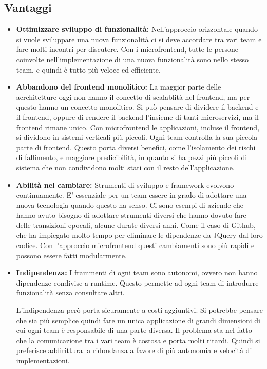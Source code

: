 \subsection*{Vantaggi}
\begin{itemize}
    \item \textbf{Ottimizzare sviluppo di funzionalità:}
Nell’approccio orizzontale quando si vuole sviluppare una nuova funzionalità ci si deve accordare tra vari team e fare molti incontri per discutere. Con i microfrontend, tutte le persone coinvolte nell’implementazione di una nuova funzionalità sono nello stesso team, e quindi è tutto più veloce ed efficiente. 
    \item \textbf{Abbandono del frontend monolitico:}
La maggior parte delle acrchitetture oggi non hanno il concetto di scalablità nel frontend, ma per questo hanno un concetto monolitico.
Si può pensare di dividere il backend e il frontend, oppure di rendere il backend l’insieme di tanti microservizi, ma il frontend rimane unico.
Con microfrontend le applicazioni, incluse il frontend, si dividono in sistemi verticali più piccoli. Ogni team controlla la sua piccola parte di frontend. Questo porta diversi benefici, come l’isolamento dei rischi di fallimento, e maggiore predicibilità, in quanto si ha pezzi più piccoli di sistema che non condividono molti stati con il resto dell’applicazione.
    \item \textbf{Abilità nel cambiare:}
Strumenti di sviluppo e framework evolvono continuamente. E’ essenziale per un team essere in grado di adottare una nuova tecnologia quando questo ha senso. Ci sono esempi di aziende che hanno avuto bisogno di adottare strumenti diversi che hanno dovuto fare delle transizioni epocali, alcune durate diversi anni. Come il caso di Github, che ha impiegato molto tempo per eliminare le dipendenze da JQuery dal loro codice. Con l’approccio microfrontend questi cambiamenti sono più rapidi e possono essere fatti modularmente.


\item \textbf{Indipendenza:}
I frammenti di ogni team sono autonomi, ovvero non hanno dipendenze condivise a runtime. Questo permette ad ogni team di introdurre funzionalità senza consultare altri.

L’indipendenza però porta sicuramente a costi aggiuntivi. Si potrebbe pensare che sia più semplice quindi fare un unica applicazione di grandi dimensioni di cui ogni team è responsabile di una parte diversa. Il problema sta nel fatto che la comunicazione tra i vari team è costosa e porta molti ritardi.
Quindi si preferisce addirittura la ridondanza a favore di più autonomia e velocità di implementazioni.

\end{itemize}

